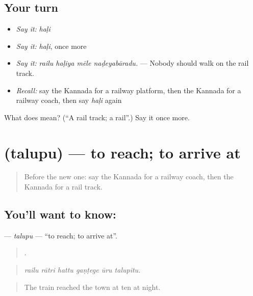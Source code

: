 \subsection*{Your turn}
\begin{itemize}
\raggedright
  \item \emph{Say it:} \emph{haḷi}
  \item \emph{Say it:} \emph{haḷi}, once more
  \item \emph{Say it:} \emph{railu haḷiya mēle naḍeyabāradu.} — Nobody should walk on the rail track.
  \item \emph{Recall:} say the Kannada for a railway platform, then the Kannada for a railway coach, then say \emph{haḷi} again
\end{itemize}

\begin{tcolorbox}[breakable,colback=teal!4,colframe=teal!35!black,title={Before you move on}]
What does  mean? (\textquotedblleft{}A rail track; a rail\textquotedblright{}.) Say it once more.
\end{tcolorbox}
\section[\texorpdfstring{\kn{ತಲುಪು} (talupu)}{ತಲುಪು (talupu)}]{ (talupu) — to reach; to arrive at}

\label{lesson:KA-C433-talupu}



\begin{quote}
Before the new one: say the Kannada for a railway coach, then the Kannada for a rail track.
\end{quote}

\subsection*{You'll want to know: }
\textbf{} — \emph{talupu} — \textquotedblleft{}to reach; to arrive at\textquotedblright{}.

\begin{quote}
     .
\end{quote}

\begin{quote}
\emph{railu rātri hattu gaṇṭege ūru talupitu.}
\end{quote}

\begin{quote}
The train reached the town at ten at night.
\end{quote}

